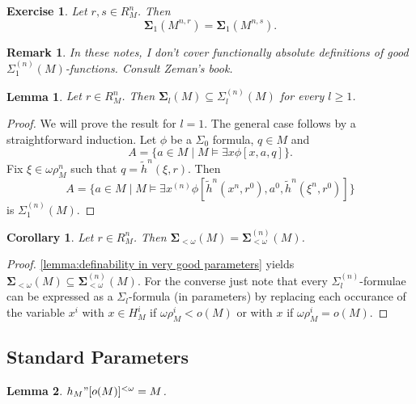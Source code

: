 \documentclass[12pt,a4paper]{article}
\theoremstyle{nicestyle}
\newtheorem{exercise}{Exercise}[subsection]
\newtheorem{lemma}{Lemma}[subsection]
\newtheorem{corollary}{Corollary}[subsection]
\newtheorem{remark}{Remark}[subsection]
\begin{document}
\begin{exercise}
  Let $r,s \in R^{n}_{M}$. Then
  \[
    \boldsymbol{\Sigma}_{1}(M^{n,r}) =
    \boldsymbol{\Sigma}_{1}(M^{n,s}).
  \]
\end{exercise}

\begin{remark}
  In these notes, I don't cover functionally absolute definitions of
  good $\Sigma^{(n)}_1(M)$-functions. Consult Zeman's book.
\end{remark}

\begin{lemma} \label{lemma:definability in very good parameters}
  Let $r \in R^{n}_{M}$. Then
  $\boldsymbol{\Sigma}_{l}(M) \subseteq \Sigma^{(n)}_{l}(M)$ for every
  $l \ge 1$.
\end{lemma}

\begin{proof}
  We will prove the result for $l = 1$. The general case follows by a
  straightforward induction. Let $\phi$ be a $\Sigma_{0}$ formula, $q \in M$ and
  \[
    A = \{ a \in M \mid M \models \exists x \phi[x,a,q] \}.
  \]
  Fix $\xi \in \omega \rho^{n}_{M}$ such that
  $q = \tilde{h}^{n}(\xi, r)$. Then
  \[
    A = \{ a \in M \mid M \models \exists x^{(n)} \phi [
    \tilde{h}^{n}(x^{n}, r^{0}), a^{0}, \tilde{h}^{n}(\xi^{n}, r^{0})]
    \}
  \]
  is $\Sigma^{(n)}_{1}(M)$.
\end{proof}

\begin{corollary}
  Let $r \in R^{n}_{M}$. Then
  $\boldsymbol{\Sigma}_{< \omega}(M) = \boldsymbol{\Sigma}^{(n)}_{<
    \omega}(M)$.
\end{corollary}

\begin{proof}
  \autoref{lemma:definability in very good parameters} yields
  $\boldsymbol{\Sigma}_{< \omega}(M) \subseteq
  \boldsymbol{\Sigma}^{(n)}_{< \omega}(M)$. For the converse just note
  that every $\Sigma^{(n)}_{l}$-formulae can be expressed as a
  $\Sigma_{l}$-formula (in parameters) by replacing each occurance of
  the variable $x^{i}$ with $x \in H^{i}_{M}$ if
  $\omega\rho^{i}_{M} < o(M)$ or with $x$ if
  $\omega \rho^{i}_{M} = o(M)$.
\end{proof}

\subsection{Standard Parameters}

\begin{lemma}
  $h_{M}" [o(M)]^{< \omega} = M$.
\end{lemma}
\end{document}
